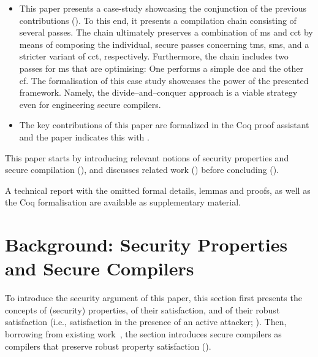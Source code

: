 \documentclass[utf8,acmsmall,review,screen,dvipsnames]{acmart}
\begin{document}
\begin{itemize}
  \item %
        This paper presents a case-study showcasing the conjunction of the previous contributions ().
        To this end, it presents a compilation chain consisting of several passes.
        The chain ultimately preserves a combination of \gls{ms} and \gls{cct} by means of composing the individual, secure passes concerning \gls{tms}, \gls{sms}, and a stricter variant of \gls{cct}, respectively.
        Furthermore, the chain includes two passes for \gls{ms} that are optimising: One performs a simple \gls{dce} and the other \gls{cf}.
        The formalisation of this case study showcases the power of the presented framework.
        Namely, the divide--and--conquer approach is a viable strategy even for engineering secure compilers.

  \item The key contributions of this paper are formalized in the Coq proof assistant and the paper indicates this with \CoqSymbol.
\end{itemize}

This paper starts by introducing relevant notions of security properties and secure compilation (),
and discusses related work () before concluding ().

 A technical report with the omitted formal details, lemmas and proofs, as well as the Coq formalisation are available as supplementary material.


\section{Background: Security Properties and Secure Compilers}\label{sec:background}

To introduce the security argument of this paper, this section first presents the concepts of (security) properties, of their satisfaction, and of their robust satisfaction (i.e., satisfaction in the presence of an active attacker; ).
Then, borrowing from existing work~\cite{abate2019jour,abate2021extacc,patrignani2021rsc}, the section introduces secure compilers as compilers that preserve robust property satisfaction ().
\end{document}
